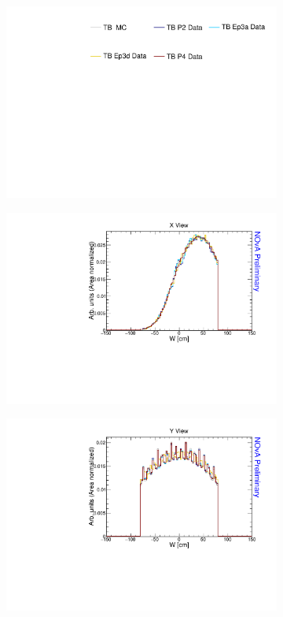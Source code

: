\begin{figure}[ht!]
  \begin{subfigure}{\textwidth}
	\centering
   	\includegraphics[height=0.2\linewidth]{essentialsec_tb/legend.pdf}
  \end{subfigure}
  \vspace*{2mm}
  
  \begin{subfigure}{0.495\textwidth}
    \includegraphics[width=\linewidth]{essentialsec_tb/nhits_w_x.pdf}
  \end{subfigure}
  \begin{subfigure}{0.495\textwidth}
    \includegraphics[width=\linewidth]{essentialsec_tb/nhits_w_y.pdf}

\end{subfigure}
\end{figure}
